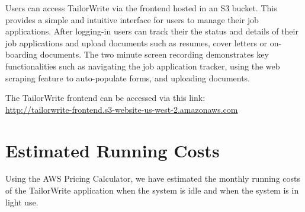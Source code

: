 \documentclass[a4paper, 11pt]{article}
\newcommand{\frontendURL}{http://tailorwrite-frontend.s3-website-us-west-2.amazonaws.com}
\begin{document}
Users can access TailorWrite via the frontend hosted in an S3 bucket. This provides a simple and intuitive interface for users to manage their job applications. After logging-in users can track their the status and details of their job applications and upload documents such as resumes, cover letters or on-boarding documents. The two minute screen recording demonstrates key functionalities such as navigating the job application tracker, using the web scraping feature to auto-populate forms, and uploading documents. 

The TailorWrite frontend can be accessed via this link: \\\url{\frontendURL}


\section{Estimated Running Costs} 

Using the AWS Pricing Calculator, we have estimated the monthly running costs of the TailorWrite application when the system is idle and when the system is in light use. 

\end{document}
